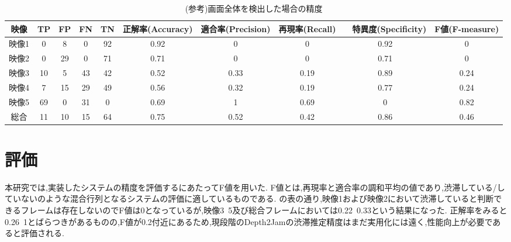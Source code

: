 \begin{table}[htbp]
  \centering
  \begin{scriptsize}
  \begin{tabular}{cccccccccc}
  \toprule
映像 & TP & FP & FN & TN & 正解率(Accuracy) & 適合率(Precision) & 再現率(Recall) &　特異度(Specificity) & F値(F-measure) \\
  \midrule
映像1 & 0 & 8 & 0 & 92 & 0.92 & 0 & 0 & 0.92 & 0 \\
映像2 & 0 & 29 & 0 & 71 & 0.71 & 0 & 0 & 0.71 & 0 \\
映像3 & 10 & 5 & 43 & 42 & 0.52 & 0.33 & 0.19 & 0.89 & 0.24 \\
映像4 & 7 & 15 & 29 & 49 & 0.56 & 0.32 & 0.19 & 0.77 & 0.24 \\
映像5 & 69 & 0 & 31 & 0 & 0.69 & 1 & 0.69 & 0 & 0.82 \\
総合 & 11 & 10 & 15 & 64 & 0.75 & 0.52 & 0.42 & 0.86 & 0.46 \\
\bottomrule
\end{tabular}
\end{scriptsize}
  \caption{(参考)画面全体を検出した場合の精度}
  \label{tab:mAP_fig_noweght}
\end{table}

\section{評価}
本研究では,実装したシステムの精度を評価するにあたってF値を用いた.
F値とは,再現率と適合率の調和平均の値であり,渋滞している/していないのような混合行列となるシステムの評価に適しているものである.
の表の通り,映像1および映像2において渋滞していると判断できるフレームは存在しないのでF値は0となっているが,映像3~5及び総合フレームにおいては0.22~0.33という結果になった.
正解率をみると0.26~1とばらつきがあるものの,F値が0.2付近にあるため,現段階のDepth2Jamの渋滞推定精度はまだ実用化には遠く,性能向上が必要であると評価される.

